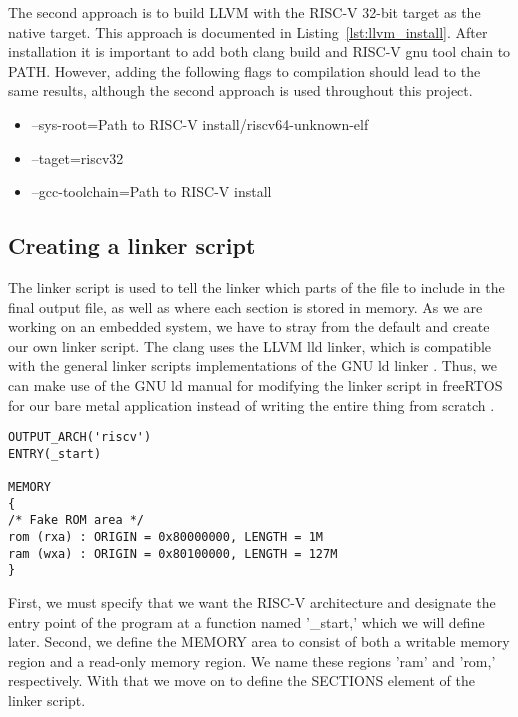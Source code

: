The second approach is to build LLVM with the RISC-V 32-bit target as the native
target. This approach is documented in Listing~\ref{lst:llvm_install}. After
installation it is important to add both clang build and RISC-V gnu tool chain to
PATH. However, adding the following flags to compilation
should lead to the same results, although the second approach is used throughout
this project.
\begin{itemize}
  \item --sys-root={Path to RISC-V install}/riscv64-unknown-elf
  \item --taget=riscv32
  \item --gcc-toolchain={Path to RISC-V install}
\end{itemize}


\subsection{Creating a linker script}
The linker script is used to tell the linker which parts of the file to include
in the final output file, as well as where each section is stored in memory. As
we are working on an embedded system, we have to stray from the default and
create our own linker script. The clang uses the LLVM lld linker, which is compatible
with the general linker scripts implementations of the GNU ld linker \cite{llvm-org-linker}.
Thus, we can make use of the GNU ld manual for modifying the linker script in freeRTOS for our bare metal application instead of writing the entire thing from scratch \cite{GNU-linker}.

\begin{lstlisting}
OUTPUT_ARCH('riscv')
ENTRY(_start)

MEMORY
{
/* Fake ROM area */
rom (rxa) : ORIGIN = 0x80000000, LENGTH = 1M
ram (wxa) : ORIGIN = 0x80100000, LENGTH = 127M
}
\end{lstlisting}
First, we must specify that we want the RISC-V architecture and designate the entry point
of the program at a function named '\_start,' which we will define later.
Second, we define the MEMORY area to consist of both a writable memory region and a read-only
memory region. We name these regions 'ram' and 'rom,' respectively. With that we move on to define the SECTIONS element of the linker script.

